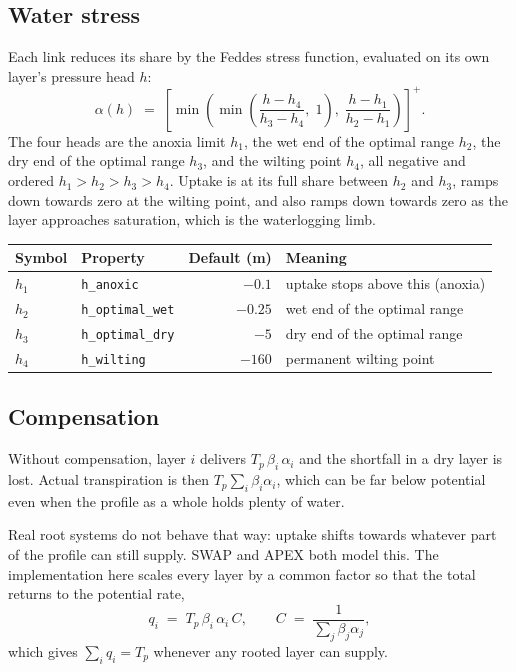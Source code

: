 \documentclass[11pt,a4paper]{article}
\newcommand{\code}[1]{\texttt{\small #1}}
\begin{document}
\subsection{Water stress}
\label{sec:feddes}

Each link reduces its share by the Feddes stress function, evaluated on its own
layer's pressure head $h$:
\begin{equation}
\alpha(h) \;=\;
\left[
\min\!\left(
  \min\!\left(\frac{h - h_4}{h_3 - h_4},\; 1\right),\;
  \frac{h - h_1}{h_2 - h_1}
\right)
\right]^{+} .
\end{equation}
The four heads are the anoxia limit $h_1$, the wet end of the optimal range
$h_2$, the dry end of the optimal range $h_3$, and the wilting point $h_4$, all
negative and ordered $h_1 > h_2 > h_3 > h_4$. Uptake is at its full share
between $h_2$ and $h_3$, ramps down towards zero at the wilting point, and also
ramps down towards zero as the layer approaches saturation, which is the
waterlogging limb.

\begin{longtable}{@{}llrl@{}}
\toprule
\textbf{Symbol} & \textbf{Property} & \textbf{Default (m)} & \textbf{Meaning} \\
\midrule
\endhead
$h_1$ & \code{h\_anoxic}        & $-0.1$  & uptake stops above this (anoxia) \\
$h_2$ & \code{h\_optimal\_wet}  & $-0.25$ & wet end of the optimal range \\
$h_3$ & \code{h\_optimal\_dry}  & $-5$    & dry end of the optimal range \\
$h_4$ & \code{h\_wilting}       & $-160$  & permanent wilting point \\
\bottomrule
\end{longtable}

\subsection{Compensation}

Without compensation, layer $i$ delivers $T_p\,\beta_i\,\alpha_i$ and the
shortfall in a dry layer is lost. Actual transpiration is then
$T_p \sum_i \beta_i \alpha_i$, which can be far below potential even when the
profile as a whole holds plenty of water.

Real root systems do not behave that way: uptake shifts towards whatever part
of the profile can still supply. SWAP and APEX both model this. The
implementation here scales every layer by a common factor so that the total
returns to the potential rate,
\begin{equation}
q_i \;=\; T_p \, \beta_i \, \alpha_i \, C ,
\qquad
C \;=\; \frac{1}{\sum_j \beta_j \alpha_j} ,
\end{equation}
which gives $\sum_i q_i = T_p$ whenever any rooted layer can supply.
\end{document}
